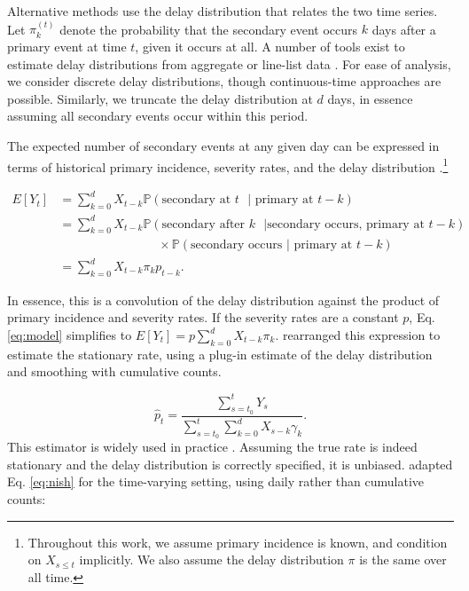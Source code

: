 \documentclass{article}
\begin{document}
Alternative methods use the delay distribution that relates the two time series. Let $\pi_k^{(t)}$ denote the probability that the secondary event occurs $k$ days after a primary event at time $t$, given it occurs at all. A number of tools exist to estimate delay distributions from aggregate or line-list data \citep{delay_distrs}. For ease of analysis, we consider discrete delay distributions, though continuous-time approaches are possible. Similarly, we truncate the delay distribution at $d$ days, in essence assuming all secondary events occur within this period. 

The expected number of secondary events at any given day can be expressed in terms of historical primary incidence, severity rates, and the delay distribution \citep{fusedlasso,nishiura}.\footnote{Throughout this work, we assume primary incidence is known, and condition on $X_{s\leq t}$ implicitly. We also assume the delay distribution $\pi$ is the same over all time.}

\begin{align}\label{eq:model}
    E[Y_t] &= \sum_{k=0}^d X_{t-k} \mathbb{P}(\text{secondary at $t$ }\vert\text{ primary at }t-k) \nonumber \\ %
            &= \sum_{k=0}^d X_{t-k} \mathbb{P}(\text{secondary after $k$ }\vert\text{secondary occurs, primary at }t-k) \nonumber \\
    &\qquad\qquad\qquad\qquad\times\mathbb{P}(\text{secondary occurs }\vert\text{ primary at $t-k$}) \nonumber \\
    &= \sum_{k=0}^d X_{t-k} \pi_k p_{t-k}.%
\end{align}

\noindent In essence, this is a convolution of the delay distribution against the product of primary incidence and severity rates. If the severity rates are a constant $p$, Eq. \ref{eq:model} simplifies to $E[Y_t] = p\sum_{k=0}^d X_{t-k}\pi_k$. \citet{nishiura} rearranged this expression to estimate the stationary rate, using a plug-in estimate of the delay distribution and smoothing with cumulative counts.

\begin{equation}\label{eq:nish}
    \hat{p}_t = \frac{\sum_{s=t_0}^t Y_s}{\sum_{s=t_0}^t \sum_{k=0}^d X_{s-k}\gamma_k}.
\end{equation}
This estimator is widely used in practice \citep{nishiuraEx1, nishiuraEx2, Russell2020}. Assuming the true rate is indeed stationary and the delay distribution is correctly specified, it is unbiased. \citet{UKpaper} adapted Eq. \ref{eq:nish} for the time-varying setting, using daily rather than cumulative counts:
\end{document}
